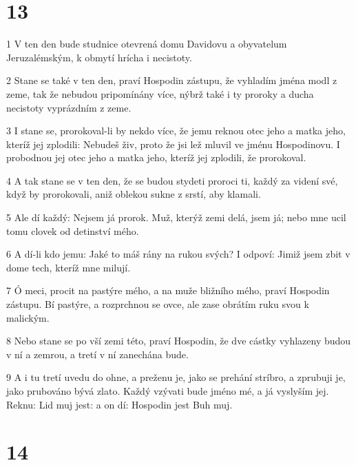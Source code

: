 \chapter{13}

\par 1 V ten den bude studnice otevrená domu Davidovu a obyvatelum Jeruzalémským, k obmytí hrícha i necistoty.
\par 2 Stane se také v ten den, praví Hospodin zástupu, že vyhladím jména modl z zeme, tak že nebudou pripomínány více, nýbrž také i ty proroky a ducha necistoty vyprázdním z zeme.
\par 3 I stane se, prorokoval-li by nekdo více, že jemu reknou otec jeho a matka jeho, kteríž jej zplodili: Nebudeš živ, proto že jsi lež mluvil ve jménu Hospodinovu. I probodnou jej otec jeho a matka jeho, kteríž jej zplodili, že prorokoval.
\par 4 A tak stane se v ten den, že se budou stydeti proroci ti, každý za videní své, když by prorokovali, aniž oblekou sukne z srstí, aby klamali.
\par 5 Ale dí každý: Nejsem já prorok. Muž, kterýž zemi delá, jsem já; nebo mne ucil tomu clovek od detinství mého.
\par 6 A dí-li kdo jemu: Jaké to máš rány na rukou svých? I odpoví: Jimiž jsem zbit v dome tech, kteríž mne milují.
\par 7 Ó meci, procit na pastýre mého, a na muže bližního mého, praví Hospodin zástupu. Bí pastýre, a rozprchnou se ovce, ale zase obrátím ruku svou k malickým.
\par 8 Nebo stane se po vší zemi této, praví Hospodin, že dve cástky vyhlazeny budou v ní a zemrou, a tretí v ní zanechána bude.
\par 9 A i tu tretí uvedu do ohne, a preženu je, jako se prehání stríbro, a zprubuji je, jako prubováno bývá zlato. Každý vzývati bude jméno mé, a já vyslyším jej. Reknu: Lid muj jest: a on dí: Hospodin jest Buh muj.

\chapter{14}

